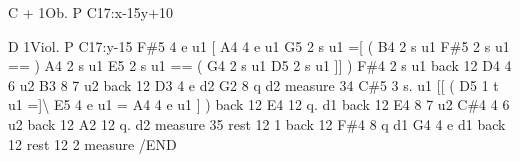 \begin{DoxyItemize}
\item C + 1\+Ob. P C17\+:x-\/15y+10
\item D 1\+Viol. P C17\+:y-\/15 F\#5 4 e u1 \mbox{[} A4 4 e u1 G5 2 s u1 =\mbox{[} ( B4 2 s u1 F\#5 2 s u1 == ) A4 2 s u1 E5 2 s u1 == ( G4 2 s u1 D5 2 s u1 \mbox{]}\mbox{]} ) F\#4 2 s u1 back 12 D4 4 6 u2 B3 8 7 u2 back 12 D3 4 e d2 G2 8 q d2 measure 34 C\#5 3 s. u1 \mbox{[}\mbox{[} ( D5 1 t u1 =\mbox{]}\textbackslash{} E5 4 e u1 = A4 4 e u1 \mbox{]} ) back 12 E4 12 q. d1 back 12 E4 8 7 u2 C\#4 4 6 u2 back 12 A2 12 q. d2 measure 35 rest 12 1 back 12 F\#4 8 q d1 G4 4 e d1 back 12 rest 12 2 measure /\+E\+ND 
\end{DoxyItemize}